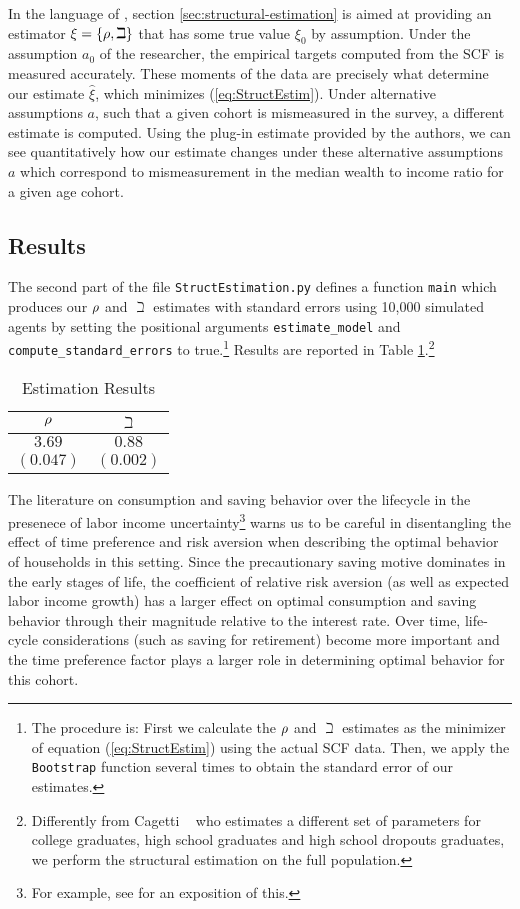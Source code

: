 In the language of \cite{andrews2017measuring}, section \ref{sec:structural-estimation} is aimed at providing an estimator $\xi =\{\rho ,\beth\}$ that has some true value $\xi_0 $ by assumption. Under the assumption $a_0$ of the researcher, the empirical targets computed from the SCF is measured accurately. These moments of the data are precisely what determine our estimate $\hat{\xi}$, which minimizes (\ref{eq:StructEstim}). Under alternative assumptions $a$, such that a given cohort is mismeasured in the survey, a different estimate is computed. Using the plug-in estimate provided by the authors, we can see quantitatively how our estimate changes under these alternative assumptions $a$ which correspond to mismeasurement in the median wealth to income ratio for a given age cohort.

\subsection{Results}
The second part of the file \texttt{StructEstimation.py}
defines a function \texttt{main} which produces our $\rho$ and
$\beth$ estimates with standard errors using 10,000 simulated
agents by setting the positional arguments \texttt{estimate\_model} and
\texttt{compute\_standard\_errors} to true.\footnote{The procedure is: First we calculate the $\rho$ and
  $\beth$ estimates as the minimizer of equation
  (\ref{eq:StructEstim}) using the actual SCF data. Then, we apply the
  \texttt{Bootstrap} function several times to obtain the standard
  error of our estimates.} Results are reported in Table
\ref{tab:EstResults}.\footnote{Differently from Cagetti
  ~\citeyearpar{cagettiWprofiles} who estimates a different set of
  parameters for college graduates, high school graduates and high
  school dropouts graduates, we perform the structural estimation on
  the full population.}


  \begin{table}[h]
    \caption{Estimation Results}\label{tab:EstResults}
    \center
    \begin{tabular}{cc}
      \hline
      $\rho $ & $\beth$\\
      \hline
      $3.69$ & $0.88$\\
      $(0.047)$ & $(0.002)$\\
      \hline
    \end{tabular}
  \end{table}

The literature on consumption and saving behavior over the lifecycle in the presenece of labor income uncertainty\footnote{For example, see \cite{gpLifecycle} for an exposition of this.} warns us to be careful in disentangling the effect of time preference and risk aversion when describing the optimal behavior of households in this setting.  Since the precautionary saving motive dominates in the early stages of life, the coefficient of relative risk aversion (as well as expected labor income growth) has a larger effect on optimal consumption and saving behavior through their magnitude relative to the interest rate. Over time, life-cycle considerations (such as saving for retirement) become more important and the time preference factor plays a larger role in determining optimal behavior for this cohort.

